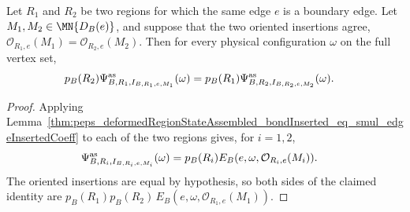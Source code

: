 \begin{lemma}
    \label{thm:peps_bondInserted_windowIndependent}
    \leanok
    Let $R_1$ and $R_2$ be two regions for which the same edge $e$ is a
    boundary edge. Let $M_1,M_2\in\MN{D_B(e)}$, and suppose that the two
    oriented insertions agree,
    $\mathcal O_{R_1,e}(M_1)=\mathcal O_{R_2,e}(M_2)$.
    Then for every physical configuration $\omega$ on the full vertex set,
    \begin{align}
        p_B(R_2)
        \Psi^{\mathrm{as}}_{B,R_1,I_{B,R_1,e,M_1}}(\omega)
         & =p_B(R_1)
        \Psi^{\mathrm{as}}_{B,R_2,I_{B,R_2,e,M_2}}(\omega).
        \notag
    \end{align}
\end{lemma}
\begin{proof}
    \leanok
    Applying
    Lemma~\ref{thm:peps_deformedRegionStateAssembled_bondInserted_eq_smul_edgeInsertedCoeff}
    to each of the two regions gives, for $i=1,2$,
    \begin{align}
        \Psi^{\mathrm{as}}_{B,R_i,I_{B,R_i,e,M_i}}(\omega)
         & =p_B(R_i)
        E_B(e,\omega,\mathcal O_{R_i,e}(M_i)).
        \notag
    \end{align}
    The oriented insertions are equal by hypothesis, so both sides of the
    claimed identity are
    $p_B(R_1)p_B(R_2)\,E_B(e,\omega,\mathcal O_{R_1,e}(M_1))$.
\end{proof}
